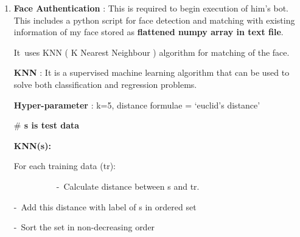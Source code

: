 \documentclass[12pt]{article}
\renewcommand{\_}{\kern-1.5pt\textunderscore\kern-1.5pt}
\begin{document}
\begin{enumerate}
	\item \textbf{Face Authentication} : This is required to begin execution of him’s bot. This includes a python script for face detection and matching with existing information of my face stored as \textbf{flattened numpy array in text file}.\par

\begin{FlushLeft}
It\ uses  KNN ( K Nearest Neighbour ) algorithm for matching of the face.
\end{FlushLeft}\par

\begin{FlushLeft}
\textbf{KNN} : It is a supervised machine learning algorithm that can be used to solve both classification and regression problems.
\end{FlushLeft}\par

\begin{FlushLeft}
\textbf{Hyper-parameter} : k=5, distance formulae = ‘euclid’s distance’
\end{FlushLeft}\par

\begin{FlushLeft}
\textbf{$\#$  s is test data}
\end{FlushLeft}\par

\begin{FlushLeft}
\textbf{KNN(s):}
\end{FlushLeft}\par

\begin{FlushLeft}
\tab For each training data (tr):
\end{FlushLeft}\par

\begin{FlushLeft}
\ \ \ \ \ \ \ \ \ \  \tab -\  Calculate distance between s and tr.
\end{FlushLeft}\par

\begin{FlushLeft}
\tab \tab -\  Add this distance with label of s in ordered set
\end{FlushLeft}\par

\begin{FlushLeft}
\tab \tab -\  Sort the set in non-decreasing order
\end{FlushLeft}\par


\end{enumerate}
\end{document}

